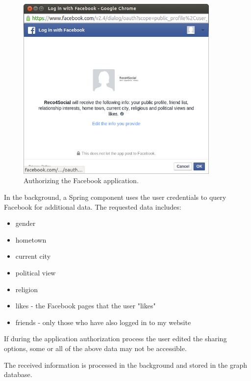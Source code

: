 \documentclass[12pt]{report}
\begin{document}
\begin{figure}[!t]
\centering
\includegraphics[width=10cm]{fb_auth.png} 
\caption[Authorizing the Facebook application.]{Authorizing the Facebook application.}
\label{fig.login.fb_app_auth}
\end{figure}

In the background, a Spring component uses the user credentials to query Facebook for additional data. The requested data includes:
\begin{itemize}
\item gender
\item hometown
\item current city
\item political view
\item religion
\item likes - the Facebook pages that the user "likes"
\item friends - only those who have also logged in to my website
\end{itemize}

If during the application authorization process the user edited the sharing options, some or all of the above data may not be accessible.

The received information is processed in the background and stored in the graph database.
\end{document}
